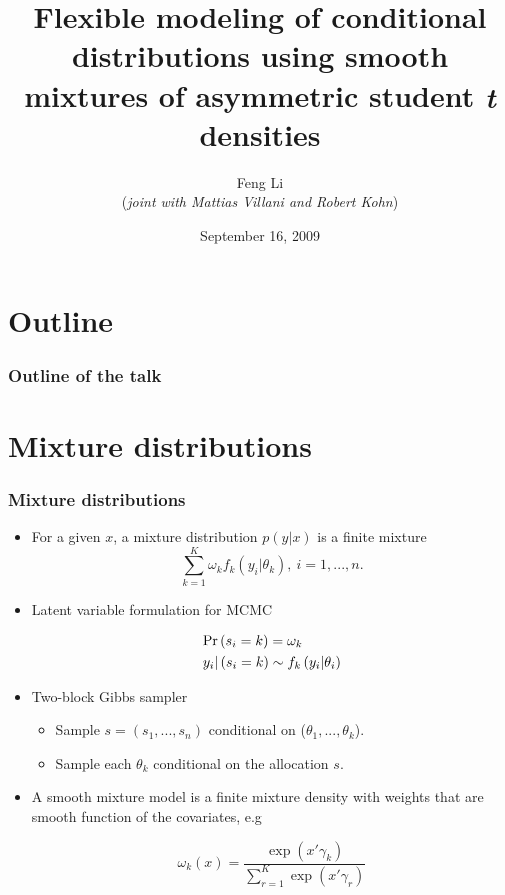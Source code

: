 \documentclass[10pt]{beamer}
\title[Regression Density Estimation]{Flexible modeling of conditional
    distributions using smooth mixtures of asymmetric student \emph{t} densities}
\author[Feng Li]{Feng Li \\ \scriptsize{ (\emph{joint with Mattias Villani and Robert
      Kohn})}}
\institute[\emph{Dept. of Statistics}, SU]{Department of Statistics\\ Stockholm University}
\date{September 16, 2009}
\begin{document}
\begin{frame}[plain]
\titlepage
\end{frame}   

\section*{Outline}
\begin{frame}  
\frametitle{Outline of the talk}
\tableofcontents
\end{frame}

\section{Mixture distributions}
\begin{frame}
\frametitle{Mixture distributions} 
\begin{itemize}
\item For a given $x$, a mixture distribution $p(y|x)$ is a finite mixture
  \[
  \sum\limits_{k = 1}^K {\omega _k f_k \left( {y_i |\theta _k } \right),~i = 1,...,n.} 
  \]

\item Latent variable formulation for MCMC

  \[
  \begin{gathered}
    \Pr \left( {s_i  = k} \right) = \omega _k  \hfill \\
    y_i |\left( {s_i  = k} \right)\sim f_k \left( {y_i |\theta _i } \right) \hfill \\ 
  \end{gathered} 
  \]

\item Two-block Gibbs sampler
  
  \begin{itemize}
  \item Sample $s=(s_1,..., s_n)$ conditional on ($\theta_1,...,\theta_k$).
  \item Sample each $\theta_k$ conditional on the allocation $s$.  
  \end{itemize}

\item A smooth mixture model is a finite mixture density with weights that are smooth
  function of the covariates, e.g 

\[
\omega _k \left( x \right) = \frac{{\exp \left( {x'\gamma _k } \right)}}
{{\sum\nolimits_{r = 1}^K {\exp \left( {x'\gamma _r } \right)} }}
\]


\end{itemize}

\end{frame}
\end{document}
